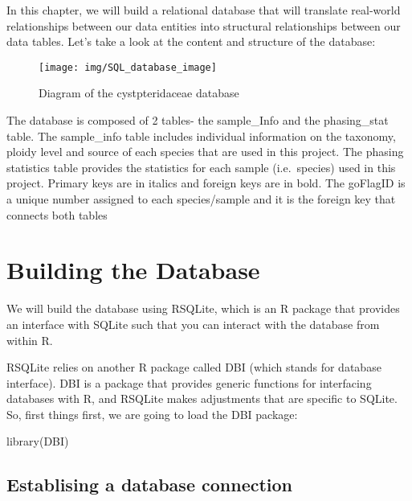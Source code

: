 \documentclass[
]{book}
\newenvironment{Shaded}{\begin{snugshade}}{\end{snugshade}}
\newcommand{\FunctionTok}[1]{\textcolor[rgb]{0.00,0.00,0.00}{#1}}
\newcommand{\NormalTok}[1]{#1}
\begin{document}
In this chapter, we will build a relational database that will translate real-world relationships between our data entities into structural relationships between our data tables. Let's take a look at the content and structure of the database:

\begin{figure}

{\centering \texttt{[image: img/SQL\_database\_image]} 

}

\caption{Diagram of the cystpteridaceae database}\label{fig:image2}
\end{figure}

The database is composed of 2 tables- the sample\_Info and the phasing\_stat table. The sample\_info table includes individual information on the taxonomy, ploidy level and source of each species that are used in this project. The phasing statistics table provides the statistics for each sample (i.e.~species) used in this project. Primary keys are in italics and foreign keys are in bold. The goFlagID is a unique number assigned to each species/sample and it is the foreign key that connects both tables

\hypertarget{building-the-database}{%
\section{Building the Database}\label{building-the-database}}

We will build the database using RSQLite, which is an R package that provides an interface with SQLite such that you can interact with the database from within R.

RSQLite relies on another R package called DBI (which stands for database interface). DBI is a package that provides generic functions for interfacing databases with R, and RSQLite makes adjustments that are specific to SQLite. So, first things first, we are going to load the DBI package:

\begin{Shaded}
\begin{Highlighting}[]
\FunctionTok{library}\NormalTok{(DBI)}
\end{Highlighting}
\end{Shaded}

\hypertarget{establising-a-database-connection}{%
\subsection{Establising a database connection}\label{establising-a-database-connection}}
\end{document}
